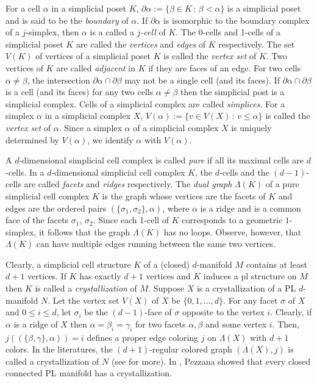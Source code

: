 \documentclass[12pt]{article}
\theoremstyle{theorem}
\theoremstyle{definition}
\begin{document}
For a cell $\alpha$ in a simplicial poset $K$, $\partial \alpha := \{\beta \in K \, : \, \beta <\alpha\}$ is a simplicial poset and is said to be the {\em boundary} of $\alpha$. If $\partial \alpha$ is isomorphic to the boundary complex of a $j$-simplex, then $\alpha$ is a called a {\em $j$-cell} of $K$. The 0-cells and 1-cells of a simplicial poset $K$ are called the {\it vertices} and {\em edges} of $K$ respectively. The set $V(K)$ of vertices of a simplicial poset $K$ is called the {\em vertex set} of $K$. Two vertices of $K$ are called {\em adjacent} in $K$ if they are faces of an edge. For two cells $\alpha\neq \beta$, the intersection $\partial\alpha \cap\partial\beta$  may not be a single cell  (and its faces). If $\partial\alpha \cap\partial\beta$ is a cell  (and its faces) for any two cells $\alpha\neq\beta$ then the simplicial post is a simplicial complex. Cells of a simplicial complex are called {\em simplices}. For a  simplex $\alpha$ in a simplicial complex $X$, $V(\alpha) := \{v\in V(X) \, : \, v\leq \alpha\}$ is called the {\em vertex set} of $\alpha$. Since a simplex $\alpha$ of a simplicial complex $X$  is uniquely determined by $V(\alpha)$, we identify $\alpha$ with $V(\alpha)$.  


A $d$-dimensional simplicial cell complex is called {\em pure} if all its maximal cells are $d$-cells. In a $d$-dimensional simplicial cell complex $K$, the $d$-cells and the $(d-1)$-cells are called {\em facets} and {\em ridges} respectively. 
The {\it dual graph} $\Lambda(K)$ of a pure simplicial cell complex $K$ is the graph whose vertices are the facets of $K$ and edges are the ordered pairs $(\{\sigma_1, \sigma_2\}, \alpha)$, where $\alpha$ is a ridge and is a common face of the facets $\sigma_1$, $\sigma_2$.  Since each 1-cell of $K$ corresponds to a geometric $1$-simplex, it follows that the graph $\Lambda(K)$ has no loops. Observe, however, that $\Lambda(K)$ can have multiple edges running between the same two vertices. 

Clearly, a simplicial cell structure $K$ of a (closed) $d$-manifold $M$ contains at least $d+1$ vertices. If $K$ has exactly $d+1$ vertices and $K$ induces a pl structure on $M$ then $K$ is called a {\em crystallization} of $M$. Suppose $X$ is a crystallization of a PL $d$-manifold $N$. Let the vertex set $V(X)$ of $X$ be $\{0, 1, \dots, d\}$. For any facet $\sigma$ of $X$ and $0\leq i\leq d$, let $\sigma_i$ be  the $(d-1)$-face of $\sigma$ opposite to the vertex $i$. 
Clearly, if $\alpha$ is a ridge of $X$ then $\alpha= \beta_i= \gamma_i$ for two facets $\alpha, \beta$ and some vertex $i$. Then, $j((\{\beta, \gamma\}, \alpha))=i$ defines a proper edge coloring $j$ on $\Lambda(X)$ with $d+1$ colors. In the literatures, the $(d+1)$-regular colored graph $(\Lambda(X), j)$ is called a crystallization of $N$ (see \cite{FGG86} for more). In \cite{Pe74}, Pezzana showed that  every closed connected PL manifold has a crystallization.
\end{document}
